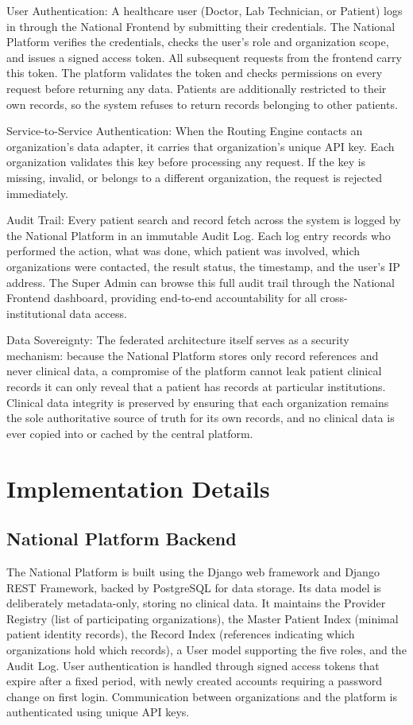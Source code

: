 \documentclass[12pt]{report}
\numberwithin{equation}{chapter}
\begin{document}
User Authentication: A healthcare user (Doctor, Lab Technician, or Patient) logs in through the National Frontend by submitting their credentials. The National Platform verifies the credentials, checks the user's role and organization scope, and issues a signed access token. All subsequent requests from the frontend carry this token. The platform validates the token and checks permissions on every request before returning any data. Patients are additionally restricted to their own records, so the system refuses to return records belonging to other patients.

Service-to-Service Authentication: When the Routing Engine contacts an organization's data adapter, it carries that organization's unique API key. Each organization validates this key before processing any request. If the key is missing, invalid, or belongs to a different organization, the request is rejected immediately.

Audit Trail: Every patient search and record fetch across the system is logged by the National Platform in an immutable Audit Log. Each log entry records who performed the action, what was done, which patient was involved, which organizations were contacted, the result status, the timestamp, and the user's IP address. The Super Admin can browse this full audit trail through the National Frontend dashboard, providing end-to-end accountability for all cross-institutional data access.

Data Sovereignty: The federated architecture itself serves as a security mechanism: because the National Platform stores only record references and never clinical data, a compromise of the platform cannot leak patient clinical records it can only reveal that a patient has records at particular institutions. Clinical data integrity is preserved by ensuring that each organization remains the sole authoritative source of truth for its own records, and no clinical data is ever copied into or cached by the central platform.

\clearpage
\section{Implementation Details}
\subsection{National Platform Backend}
The National Platform is built using the Django web framework and Django REST Framework, backed by PostgreSQL for data storage. Its data model is deliberately metadata-only, storing no clinical data. It maintains the Provider Registry (list of participating organizations), the Master Patient Index (minimal patient identity records), the Record Index (references indicating which organizations hold which records), a User model supporting the five roles, and the Audit Log. User authentication is handled through signed access tokens that expire after a fixed period, with newly created accounts requiring a password change on first login. Communication between organizations and the platform is authenticated using unique API keys.
\end{document}

